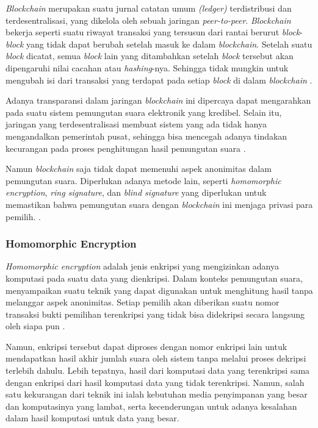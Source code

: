 \documentclass[12pt, a4paper, final]{article}
\begin{document}
\textit{Blockchain} merupakan suatu jurnal catatan umum \textit{(ledger)} terdistribusi dan terdesentralisasi, yang dikelola oleh sebuah jaringan \textit{peer-to-peer}. \textit{Blockchain} bekerja seperti suatu riwayat transaksi yang tersusun dari rantai berurut \textit{block}-\textit{block} yang tidak dapat berubah setelah masuk ke dalam \textit{blockchain}. Setelah suatu \textit{block} dicatat, semua \textit{block} lain yang ditambahkan setelah \textit{block} tersebut akan dipengaruhi nilai cacahan atau \textit{hashing}-nya. Sehingga tidak mungkin untuk mengubah isi dari transaksi yang terdapat pada setiap \textit{block} di dalam \textit{blockchain} \citep{koreanevoting}.

Adanya transparansi dalam jaringan \textit{blockchain} ini dipercaya dapat mengarahkan pada suatu sistem pemungutan suara elektronik yang kredibel. Selain itu, jaringan yang terdesentralisasi membuat sistem yang ada tidak hanya mengandalkan pemerintah pusat, sehingga bisa mencegah adanya tindakan kecurangan pada proses penghitungan hasil pemungutan suara \citep{blockchain}.

Namun \textit{blockchain} saja tidak dapat memenuhi aspek anonimitas dalam pemungutan suara. Diperlukan adanya metode lain, seperti \textit{homomorphic encryption}, \textit{ring signature}, dan \textit{blind signature} yang diperlukan untuk memastikan bahwa pemungutan suara dengan \textit{blockchain} ini menjaga privasi para pemilih. \citep{koreanevoting}.

\subsubsection{Homomorphic Encryption}

\textit{Homomorphic encryption} adalah jenis enkripsi yang mengizinkan adanya komputasi pada suatu data yang dienkripsi. Dalam konteks pemungutan suara, \cite{end2end} menyampaikan suatu teknik yang dapat digunakan untuk menghitung hasil tanpa melanggar aspek anonimitas. Setiap pemilih akan diberikan suatu nomor transaksi bukti pemilihan terenkripsi yang tidak bisa didekripsi secara langsung oleh siapa pun \citep{homomorphic2}.

Namun, enkripsi tersebut dapat diproses dengan nomor enkripsi lain untuk mendapatkan hasil akhir jumlah suara oleh sistem tanpa melalui proses dekripsi terlebih dahulu. Lebih tepatnya, hasil dari komputasi data yang terenkripsi sama dengan enkripsi dari hasil komputasi data yang tidak terenkripsi. Namun, salah satu kekurangan dari teknik ini ialah kebutuhan media penyimpanan yang besar dan komputasinya yang lambat, serta kecenderungan untuk adanya kesalahan dalam hasil komputasi untuk data yang besar. \citep{homomorphic1} 
\end{document}
